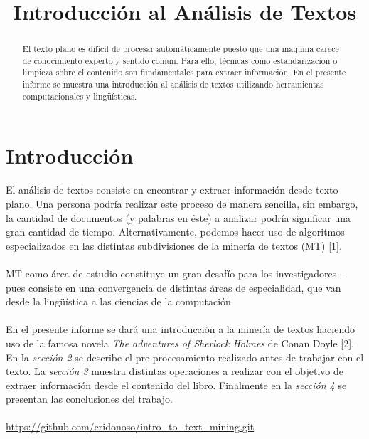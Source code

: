 \documentclass[conference]{IEEEtran}
\begin{document}
\title{Introducción al Análisis de Textos}
\author{
\and
{}
}

\maketitle
\begin{abstract}
El texto plano es difícil de procesar automáticamente puesto que una maquina carece de conocimiento experto y sentido común. Para ello, técnicas como estandarización o limpieza sobre el contenido son fundamentales para extraer información. En el presente informe se muestra una introducción al análisis de textos utilizando herramientas computacionales y lingüísticas.
\end{abstract}
\IEEEpeerreviewmaketitle

\section{Introducción}
El análisis de textos consiste en encontrar y extraer información desde texto plano. Una persona podría realizar este proceso de manera sencilla, sin embargo, la cantidad de documentos (y palabras en éste) a analizar podría significar una gran cantidad de tiempo. Alternativamente, podemos hacer uso de algoritmos especializados en las distintas subdivisiones de la minería de textos (MT) [1].\\\\ MT como área de estudio constituye un gran desafío para los investigadores - pues consiste en una convergencia de distintas áreas de especialidad, que van desde la lingüística a las ciencias de la computación.\\\\En el presente informe se dará una introducción a la minería de textos haciendo uso de la famosa novela \textit{The adventures of Sherlock Holmes} de Conan Doyle [2]. En la \textit{sección 2} se describe el pre-procesamiento realizado antes de trabajar con el texto. La \textit{sección 3} muestra distintas operaciones a realizar con el objetivo de extraer información desde el contenido del libro. Finalmente en la \textit{sección 4} se presentan las conclusiones del trabajo.\\\\{\scriptsize \url{https://github.com/cridonoso/intro_to_text_mining.git}}
\end{document}
